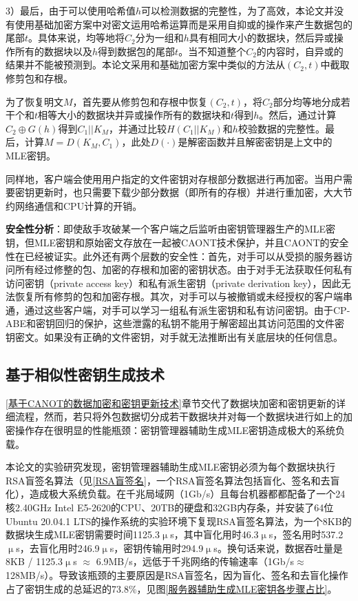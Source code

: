 \documentclass[promaster]{thesis-uestc}
\begin{document}
3）最后，由于可以使用哈希值$h$可以检测数据的完整性，为了高效，本论文并没有使用基础加密方案中对密文运用哈希运算而是采用自抑或的操作来产生数据包的尾部$t$。具体来说，均等地将$C_2$分为一组和$h$具有相同大小的数据块，然后异或操作所有的数据块以及$h$得到数据包的尾部$t$。当不知道整个$C_2$的内容时，自异或的结果并不能被预测到。本论文采用和基础加密方案中类似的方法从$(C_2, t)$中截取修剪包和存根。

为了恢复明文$M$，首先要从修剪包和存根中恢复$(C_2, t)$，将$C_2$部分均等地分成若干个和$t$相等大小的数据块并异或操作所有的数据块和$t$得到$h$。然后，通过计算$C_2 \oplus G(h)$得到$C_1||K_M$，并通过比较$H(C_1||K_M)$和$h$校验数据的完整性。最后，计算$M = D(K_M, C_1)$，此处$D(\cdot)$是解密函数并且解密密钥是上文中的MLE密钥。

同样地，客户端会使用用户指定的文件密钥对存根部分数据进行再加密。当用户需要密钥更新时，也只需要下载少部分数据（即所有的存根）并进行重加密，大大节约网络通信和CPU计算的开销。

\textbf{安全性分析}：即使敌手攻破某一个客户端之后监听由密钥管理器生产的MLE密钥，但MLE密钥和原始密文存放在一起被CAONT技术保护，并且CAONT的安全性在\cite{li2015cdstore}已经被证实。此外还有两个层数的安全性：首先，对手可以从受损的服务器访问所有经过修整的包、加密的存根和加密的密钥状态。由于对手无法获取任何私有访问密钥（private access key）和私有派生密钥（private derivation key），因此无法恢复所有修剪的包和加密存根。其次，对手可以与被撤销或未经授权的客户端串通，通过这些客户端，对手可以学习一组私有派生密钥和私有访问密钥。由于CP-ABE和密钥回归的保护，这些泄露的私钥不能用于解密超出其访问范围的文件密钥密文。如果没有正确的文件密钥，对手就无法推断出有关底层块的任何信息。

\subsection{基于相似性密钥生成技术}
\ref{基于CANOT的数据加密和密钥更新技术}章节交代了数据块加密和密钥更新的详细流程，然而，若只将外包数据切分成若干数据块并对每一个数据块进行如上的加密操作存在很明显的性能瓶颈：密钥管理器辅助生成MLE密钥造成极大的系统负载。

本论文的实验研究发现，密钥管理器辅助生成MLE密钥必须为每个数据块执行RSA盲签名算法（见\ref{RSA盲签名}，一个RSA盲签名算法包括盲化、签名和去盲化），造成极大系统负载。在千兆局域网（1Gb/s）且每台机器都都配备了一个24核2.40GHz Intel E5-2620的CPU、20TB的硬盘和32GB内存条，并安装了64位Ubuntu 20.04.1 LTS的操作系统的实验环境下复现RSA盲签名算法，为一个8KB的数据块生成MLE密钥需要时间1125.3$\upmu$s，其中盲化用时46.3$\upmu$s，签名用时537.2$\upmu$s，去盲化用时246.9$\upmu$s，密钥传输用时294.9$\upmu$s。换句话来说，数据吞吐量是8KB / 1125.3$\upmu$s $\approx$ 6.9MB/s，远低于千兆网络的传输速率（1Gb/s$\approx$128MB/s）。导致该瓶颈的主要原因是RSA盲签名，因为盲化、签名和去盲化操作占了密钥生成的总延迟的73.8\%，见图\ref{服务器辅助生成MLE密钥各步骤占比}。
\end{document}
